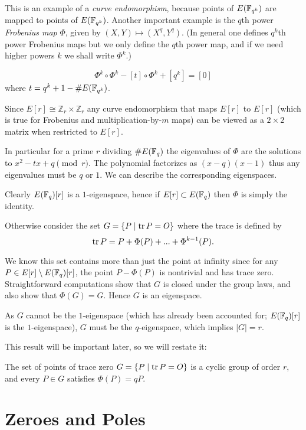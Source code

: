 This is an example of a \emph{curve endomorphism}, because points of
$E(\mathbb{F}_{q^k})$ are mapped to points of $E(\mathbb{F}_{q^k})$. Another important example
is the $q$th power \emph{Frobenius map} $\Phi$,
given by $(X, Y) \mapsto (X^{q}, Y^{q})$. (In general one defines
$q^k$th power Frobenius maps but we only define the $q$th power map,
and if we need higher powers $k$ we shall write $\Phi^k$.)

\begin{theorem}
[Hasse]
\[ \Phi^k \circ \Phi^k - [t] \circ \Phi^k + [q^k] = [0] \]
where $t = q^k + 1 - \#E(\mathbb{F}_{q^k})$.
\end{theorem}

Since $E[r] \cong \mathbb{Z}_r \times \mathbb{Z}_r$ any curve endomorphism
that maps $E[r]$ to $E[r]$ (which is true for Frobenius and
multiplication-by-$m$ maps)
can be viewed as a $2\times 2$ matrix when restricted to $E[r]$.

In particular for a prime $r$ dividing $\#E(\mathbb{F}_q)$ the eigenvalues
of $\Phi$ are the solutions to $x^2 - t x + q \pmod{r}$.
The polynomial factorizes as $(x - q)(x - 1)$ thus any eigenvalues
must be $q$ or $1$. We can describe the corresponding eigenspaces.

Clearly $E(\mathbb{F}_q)[r]$ is a $1$-eigenspace, hence if $E[r] \subset E(\mathbb{F}_q)$
then $\Phi$ is simply the identity.

Otherwise consider the set $G = \{P \mid \mathop{\rm tr} P = O \}$
where the trace is defined by
\[ \mathop{\rm tr} P = P + \Phi(P) + ... + \Phi^{k-1}(P)  .\]

We know this set contains more than just the point at infinity
since for any $P \in E[r] \setminus E(\mathbb{F}_q)[r]$,
the point $P - \Phi(P)$ is nontrivial and has trace zero.
Straightforward computations show that $G$ is closed under the group laws,
and also show that $\Phi(G) = G$. Hence $G$ is an eigenspace.

As $G$ cannot be the $1$-eigenspace (which has already been accounted for;
$E(\mathbb{F}_q)[r]$ is the $1$-eigenspace), $G$ must be the $q$-eigenspace,
which implies $|G| = r$.

This result will be important later, so we will restate it:

\begin{theorem}
The set of points of trace zero
$G = \{P \mid \mathop{\rm tr} P = O \}$ is a cyclic group of order $r$,
and every $P \in G$ satisfies $\Phi(P) = q P$.
\end{theorem}

\section {Zeroes and Poles}

